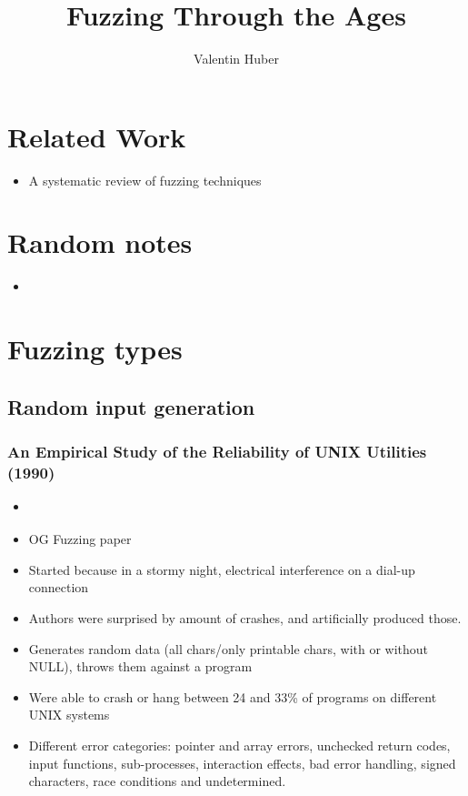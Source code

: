 \documentclass[12pt]{article}
\title{Fuzzing Through the Ages}
\author{Valentin Huber}
\begin{document}


\maketitle
\tableofcontents

\section{Related Work}
\begin{itemize}
    \item A systematic review of fuzzing techniques\cite{Science}
\end{itemize}


\section{Random notes}
\begin{itemize}
    \item {}\cite{DART}
\end{itemize}

\section{Fuzzing types}
\subsection{Random input generation}
\subsubsection{An Empirical Study of the Reliability of UNIX Utilities (1990)}
\begin{itemize}
    \item \cite{UNIX}
    \item OG Fuzzing paper
    \item Started because in a stormy night, electrical interference on a dial-up connection
    \item Authors were surprised by amount of crashes, and artificially produced those.
    \item Generates random data (all chars/only printable chars, with or without NULL), throws them against a program
    \item Were able to crash or hang between 24 and 33\% of programs on different UNIX systems
    \item Different error categories: pointer and array errors, unchecked return codes, input functions, sub-processes, interaction effects, bad error handling, signed characters, race conditions and undetermined.
\end{itemize}
\end{document}
